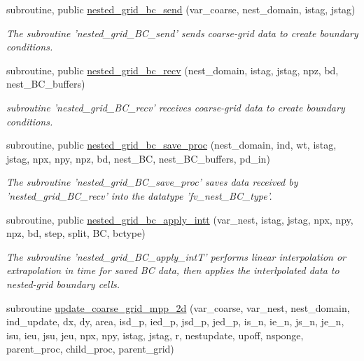 \begin{DoxyCompactItemize}
\item 
subroutine, public \hyperlink{classboundary__mod_a9664fc48d6b87bd55e287433b222f689}{nested\-\_\-grid\-\_\-bc\-\_\-send} (var\-\_\-coarse, nest\-\_\-domain, istag, jstag)
\begin{DoxyCompactList}\small\item\em The subroutine 'nested\-\_\-grid\-\_\-\-B\-C\-\_\-send' sends coarse-\/grid data to create boundary conditions. \end{DoxyCompactList}\item 
subroutine, public \hyperlink{classboundary__mod_a2a2c3a63d13242976d2223388194609a}{nested\-\_\-grid\-\_\-bc\-\_\-recv} (nest\-\_\-domain, istag, jstag, npz, bd, nest\-\_\-\-B\-C\-\_\-buffers)
\begin{DoxyCompactList}\small\item\em subroutine 'nested\-\_\-grid\-\_\-\-B\-C\-\_\-recv' receives coarse-\/grid data to create boundary conditions. \end{DoxyCompactList}\item 
subroutine, public \hyperlink{classboundary__mod_accf7a95e05bf3add0378120b4879226a}{nested\-\_\-grid\-\_\-bc\-\_\-save\-\_\-proc} (nest\-\_\-domain, ind, wt, istag, jstag, npx, npy, npz, bd, nest\-\_\-\-B\-C, nest\-\_\-\-B\-C\-\_\-buffers, pd\-\_\-in)
\begin{DoxyCompactList}\small\item\em The subroutine 'nested\-\_\-grid\-\_\-\-B\-C\-\_\-save\-\_\-proc' saves data received by 'nested\-\_\-grid\-\_\-\-B\-C\-\_\-recv' into the datatype 'fv\-\_\-nest\-\_\-\-B\-C\-\_\-type'. \end{DoxyCompactList}\item 
subroutine, public \hyperlink{classboundary__mod_af498d6c23d9fa3a15e89d24797a895c7}{nested\-\_\-grid\-\_\-bc\-\_\-apply\-\_\-intt} (var\-\_\-nest, istag, jstag, npx, npy, npz, bd, step, split, B\-C, bctype)
\begin{DoxyCompactList}\small\item\em The subroutine 'nested\-\_\-grid\-\_\-\-B\-C\-\_\-apply\-\_\-int\-T' performs linear interpolation or extrapolation in time for saved B\-C data, then applies the interlpolated data to nested-\/grid boundary cells. \end{DoxyCompactList}\item 
subroutine \hyperlink{classboundary__mod_ade44b1c7177090f54126a0b3b76f72bf}{update\-\_\-coarse\-\_\-grid\-\_\-mpp\-\_\-2d} (var\-\_\-coarse, var\-\_\-nest, nest\-\_\-domain, ind\-\_\-update, dx, dy, area, isd\-\_\-p, ied\-\_\-p, jsd\-\_\-p, jed\-\_\-p, is\-\_\-n, ie\-\_\-n, js\-\_\-n, je\-\_\-n, isu, ieu, jsu, jeu, npx, npy, istag, jstag, r, nestupdate, upoff, nsponge, parent\-\_\-proc, child\-\_\-proc, parent\-\_\-grid)

\end{DoxyCompactItemize}
